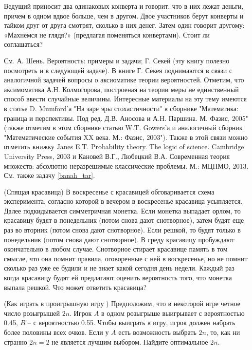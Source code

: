 \begin{problem}
Ведущий приносит два одинаковых конверта и говорит, что в них лежат деньги, причем в одном вдвое больше, чем в другом. Двое участников берут конверты и тайком друг от друга смотрят, сколько в них денег. Затем один говорит другому: «Махнемся не глядя?» (предлагая поменяться конвертами). Стоит ли соглашаться?
\end{problem}
\begin{remark}
См. А. Шень. Вероятность: примеры и задачи; Г. Секей \cite{book12} (эту книгу полезно посмотреть и в следующей задаче). В книге Г. Секея поднимаются в связи с аналогичной задачей вопросы о аксиоматике теории вероятностей. Отметим, что аксимоматика А.Н. Колмогорова, построеная на теории меры не единственный способ ввести случайные величины. Интересные материалы на эту тему имеются в статье D. Mumford'а "На заре эры стохастичности" в сборнике "Математика: граница и перспективы. Под ред. Д.В. Аносова и А.Н. Паршина. М. Фазис, 2005" (также отметим в этом сборнике статью W.T. Gowers'а и аналогичный сборник "Математические события XX века. М.: Фазис, 2003"). Также в этой связи можно отметить книжку Janes E.T. Probability theory. The logic of science. Cambridge University Press, 2003 и Кановей В.Г., Любецкий В.А. Современная теория множеств: абсолютно неразрешимые классические проблемы. М.: МЦНМО, 2013.  См. также задачу \ref{banah_tar}.
\end{remark}

\begin{problem}(Спящая красавица)
В воскресенье с красавицей обговаривается схема эксперимента, согласно которой в вечером в воскресенье красавица усыпляется. Далее подкидывается симметричная монетка. Если монетка выпадает орлом, то красавицу будят в понедельник (потом снова дают снотворное), затем будят еще раз во вторник (потом снова дают снотворное). Если решкой, то будят только в понедельник (потом снова дают снотворное). В среду красавицу пробуждают окончательно в любом случае. Снотворное стирает красавице память в том смысле, что она помнит правила, оговоренные с ней в воскресенье, но не помнит сколько раз уже ее будили и не знает какой сегодня день недели. Каждый раз когда красавицу будят ей предлагают оценить вероятность того, что монетка выпала решкой. Что может ответить красавица?
\end{problem}

\begin{problem}(Как играть в проигрышную игру \cite{book12}) 
Предположим, что в некоторой игре четное число розыгрышей $2n$. Игрок  $A$ в одном розыгрыше выигрывает с вероятностью 0.45, $B$ --  с вероятностью 0.55. Чтобы выиграть в игру, игрок должен набрать более половины всех очков. Если у  $A$ есть возможность выбрать  $2n$, то, как ни странно $2n=2$ не является лучшим выбором. Найдите оптимальное $2n$.    
\end{problem}


